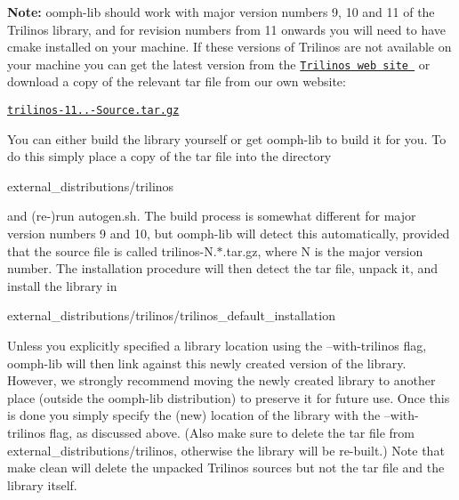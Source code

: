 {\bfseries Note\+:} {\ttfamily oomph-\/lib} should work with major version numbers 9, 10 and 11 of the Trilinos library, and for revision numbers from 11 onwards you will need to have {\ttfamily cmake} installed on your machine. If these versions of {\ttfamily Trilinos} are not available on your machine you can get the latest version from the \href{http://trilinos.sandia.gov/}{\tt Trilinos web site } or download a copy of the relevant tar file from our own website\+:

\begin{center} \href{../../../../oomph-lib_external_distfiles/trilinos-11.8.1-Source.tar.gz}{\tt trilinos-\/11..-\/\+Source.\+tar.\+gz} \end{center} 

You can either build the library yourself or get {\ttfamily oomph-\/lib} to build it for you. To do this simply place a copy of the tar file into the directory 
\begin{DoxyCode}
external\_distributions/trilinos
\end{DoxyCode}
 and (re-\/)run {\ttfamily autogen.\+sh}. The build process is somewhat different for major version numbers 9 and 10, but oomph-\/lib will detect this automatically, provided that the source file is called trilinos-\/N.$\ast$.tar.\+gz, where N is the major version number. The installation procedure will then detect the tar file, unpack it, and install the library in 
\begin{DoxyCode}
external\_distributions/trilinos/trilinos\_default\_installation
\end{DoxyCode}
 Unless you explicitly specified a library location using the {\ttfamily --with-\/trilinos} flag, {\ttfamily oomph-\/lib} will then link against this newly created version of the library. However, we strongly recommend moving the newly created library to another place (outside the {\ttfamily oomph-\/lib} distribution) to preserve it for future use. Once this is done you simply specify the (new) location of the library with the {\ttfamily --with-\/trilinos} flag, as discussed above. (Also make sure to delete the tar file from {\ttfamily external\+\_\+distributions/trilinos}, otherwise the library will be re-\/built.) Note that {\ttfamily make} {\ttfamily clean} will delete the unpacked {\ttfamily Trilinos} sources but not the tar file and the library itself.



